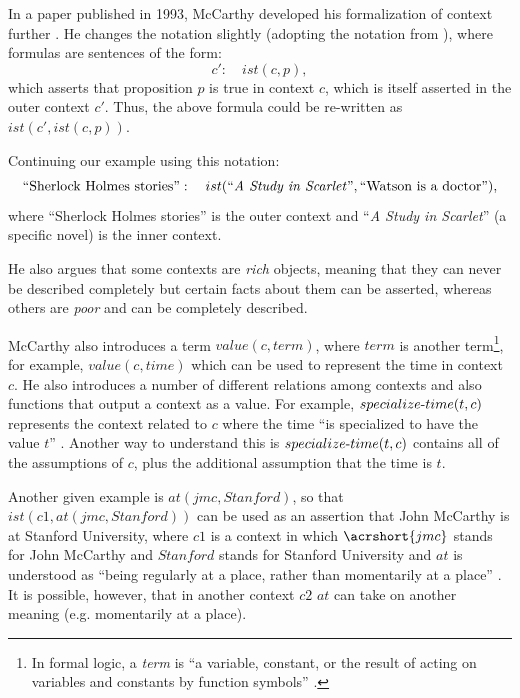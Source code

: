 In a paper published in 1993, McCarthy developed his formalization of context further \cite{McCarthy1993}. He changes the notation slightly (adopting the notation from \cite{guha1991contexts}), where formulas are sentences of the form:
\begin{equation}
  \label{eq:ist1}
 c': \quad	ist(c,p),
\end{equation}
which asserts that proposition $p$ is true in context $c$, which is itself asserted in the outer context $c'$. Thus, the above formula could be re-written as $ist(c', ist(c,p))$. 

Continuing our example using this notation:
\begin{equation}
  \label{eq:context1}
 \text{``Sherlock Holmes stories''}: \quad	ist(\text{``\emph{A Study in Scarlet}''},\text{``Watson is a doctor''}),
\end{equation}
where ``Sherlock Holmes stories'' is the outer context and ``\emph{A Study in Scarlet}'' (a specific novel) is the inner context.

He also argues that some contexts are \emph{rich} objects, meaning that they can never be described completely but certain facts about them can be asserted, whereas others are \emph{poor} and can be completely described.

McCarthy also introduces a term $value(c,term)$, where $term$ is another term\footnote{In formal logic, a \emph{term} is ``a variable, constant, or the result of acting on variables and constants by function symbols'' \cite{Weisstein2014}.}, for example, $value(c,time)$ which can be used to represent the time in context $c$. He also introduces a number of different relations among contexts and also functions that output a context as a value. For example, $specialize\textnormal{-}time(t, c)$ represents the context related to $c$ where the time ``is specialized to have the value $t$'' \cite{McCarthy1993}. Another way to understand this is $specialize\textnormal{-}time(t, c)$ contains all of the assumptions of $c$, plus the additional assumption that the time is $t$.

Another given example is $at(jmc, Stanford)$, so that $ist(c1, at(jmc, Stanford))$ can be used as an assertion that John McCarthy  is at Stanford University, where $c1$ is a context in which $\acrshort{jmc}$ stands for John McCarthy and $Stanford$ stands for Stanford University and $at$ is understood as ``being regularly at a place, rather than momentarily at a place'' \cite{McCarthy1993}. It is possible, however, that in another context $c2$ $at$ can take on another meaning (e.g. momentarily at a place).

